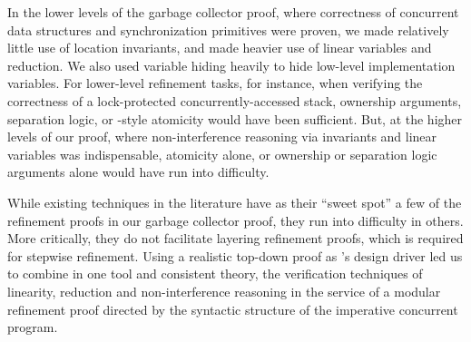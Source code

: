 In the lower levels of the garbage collector proof, where
correctness of concurrent data structures and synchronization primitives were proven, we made
relatively little use of location invariants, and made heavier use of
linear variables and reduction. 
We also used variable hiding heavily to hide low-level implementation
variables. 
For lower-level refinement tasks, for instance, when verifying the correctness of a
lock-protected concurrently-accessed stack, ownership
arguments, separation logic, or \QED-style atomicity would have been
sufficient. 
But, at the higher levels of our proof, where non-interference
reasoning via invariants and linear variables was indispensable, 
atomicity alone, or ownership or separation logic arguments alone
would have run into difficulty. 

While existing techniques in the literature have as their
``sweet spot'' a few of the refinement proofs in our garbage collector
proof, they run into difficulty in others. 
More critically, they
do not facilitate layering refinement proofs, which is required for stepwise
refinement. 
Using a realistic top-down proof as \civl's design driver led us to
combine in one tool and consistent theory, the verification techniques
of linearity, reduction and non-interference reasoning in the service
of a modular refinement proof directed by the syntactic structure of
the imperative concurrent program. 

